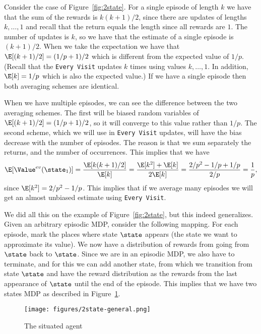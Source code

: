 Consider the case of Figure~\ref{fig:2state}. For a single episode
of length $k$ we have that the sum of the rewards is $k(k+1)/2$,
since there are updates of lengths $k, \ldots , 1$ and recall that
the return equals the length since all rewards are $1$. The number
of updates is $k$, so we have that the estimate of a single episode
is $(k+1)/2$. When we take the expectation we have that
$\E[(k+1)/2]=(1/p+1)/2$ which is different from the expected value of
$1/p$. (Recall that the {\tt Every Visit} updates $k$ times using
values $k,\ldots,1$. In addition, $\E[k]=1/p$ which is also the
expected value.) If we have a single episode then both averaging
schemes are identical.

When we have multiple episodes, we can see the difference between
the two averaging schemes. The first will be biased random variables
of $\E[(k+1)/2]=(1/p+1)/2$, so it will converge to this value rather
than $1/p$. The second scheme, which we will use in {\tt Every
Visit} updates, will have the bias decrease with the number of
episodes. The reason is that we sum separately the returns, and the
number of occurrences. This implies that we have
\[
\E[\Value^{ev}(\state_1)]=\frac{\E[k(k+1)/2]}{\E[k]}=\frac{\E[k^2]+\E[k]}{2\E[k]}=
\frac{2/p^2-1/p+1/p}{2/p}=\frac{1}{p},
\]
since $\E[k^2]=2/p^2-1/p$. This implies that if we average many
episodes we will get an almost unbiased estimate using {\tt Every
Visit}.

We did all this on the example of Figure~\ref{fig:2state}, but this
indeed generalizes. Given an arbitrary episodic MDP, consider the
following mapping. For each episode, mark the places where state
$\state$ appears (the state we want to approximate its value). We
now have a distribution of rewards from going from $\state$ back to
$\state$. Since we are in an episodic MDP, we also have to
terminate, and for this we can add another state, from which we
transition from state $\state$ and have the reward distribution as
the rewards from the last appearance of $\state$ until the end of
the episode.
This implies that we have two states MDP as described in
Figure~\ref{fig:2state-general}.


\begin{figure}
  \begin{centering}
  \texttt{[image: figures/2state-general.png]}\\
  \caption{The situated agent}\label{fig:2state-general}
  \end{centering}
\end{figure}


